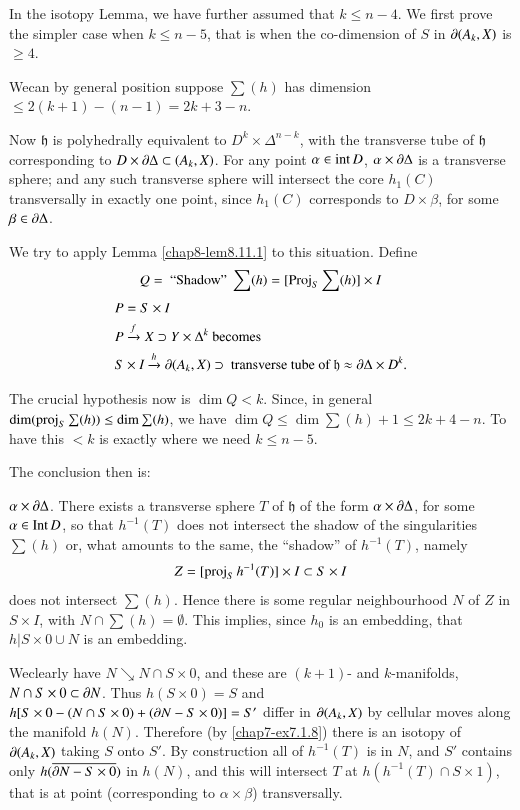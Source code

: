 In the isotopy Lemma, we have further assumed that $k\leq n-4$. We first prove the simpler case when $k\leq n-5$, that is when the co-dimension of $S$ in $\partial(A_{k},X)$ is $\geq 4$.

We\pageoriginale can by general position suppose $\sum(h)$ has dimension $\leq 2(k+1)-(n-1)=2k+3-n$.

Now $\mathfrak{h}$ is polyhedrally equivalent to $D^{k}\times \Delta^{n-k}$, with the transverse tube of $\mathfrak{h}$ corresponding to $D\times \partial\Delta \subset (A_{k},X)$. For any point $\alpha\in \text{int\,}D$, $\alpha\times \partial \Delta$ is a transverse sphere; and any such transverse sphere will intersect the core $h_{1}(C)$ transversally in exactly one point, since $h_{1}(C)$ corresponds to $D\times \beta$, for some $\beta\in \partial \Delta$.

We try to apply Lemma \ref{chap8-lem8.11.1} to this situation. Define 
$$Q= \mbox{ ``Shadow'' } \sum(h)=[\operatorname{Proj}_{S}\sum (h)]\times I$$
\begin{align*}
& P=S\times I\\
& P\xrightarrow{f}X\supset Y\times \Delta^{k}\text{~ becomes}\\
& S\times I\xrightarrow{h}\partial (A_{k},X)\supset\text{~ transverse tube of~ } \mathfrak{h}\approx \partial \Delta \times D^{k}. 
\end{align*}

The crucial hypothesis now is $\dim Q<k$. Since, in general\break $\dim(\operatorname{proj}_{S}\sum (h))\leq \dim \sum(h)$, we have $\dim Q\leq \dim \sum(h)+1\leq 2k+4-n$. To have this $<k$ is exactly where we need $k\leq n-5$.

The conclusion then is:

$\alpha\times\partial \Delta$. There exists a transverse sphere $T$ of $\mathfrak{h}$ of the form $\alpha\times\partial \Delta$, for some $\alpha\in\operatorname{Int} D$, so that $h^{-1}(T)$ does not intersect the shadow of the singularities $\sum(h)$ or, what amounts to the same, the ``shadow'' of $h^{-1}(T)$, namely
$$
Z=[\operatorname{proj}_{S}h^{-1}(T)]\times I\subset S\times I
$$
does not intersect $\sum(h)$. Hence there is some regular neighbourhood $N$ of $Z$ in $S\times I$, with $N\cap \sum(h)=\emptyset$. This implies, since $h_{0}$ is an embedding, that $h|S\times 0\cup N$ is an embedding.

We\pageoriginale clearly have $N\searrow N\cap S\times 0$, and these are $(k+1)$- and $k$-manifolds, $N\cap S\times 0\subset \partial N$. Thus $h(S\times 0)=S$ and $h[S\times 0-(N\cap S\times 0)+(\partial N-S\times 0)]=S'$ differ in $\partial(A_{k},X)$ by cellular moves along the manifold $h(N)$. Therefore (by \ref{chap7-ex7.1.8}) there is an isotopy of $\partial(A_{k},X)$ taking $S$ onto $S'$. By construction all of $h^{-1}(T)$ is in $N$, and $S'$ contains only $h(\overline{\partial N-S\times 0})$ in $h(N)$, and this will intersect $T$ at $h(h^{-1}(T)\cap S\times 1)$, that is at point (corresponding to $\alpha\times \beta$) transversally.

